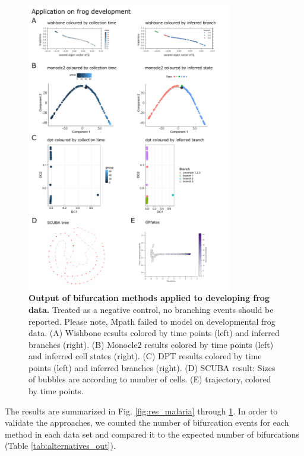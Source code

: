 \begin{figure}
    \centering
    \includegraphics[width=0.8\textwidth]{"results_frog"}
    \caption[Output of bifurcation methods applied to developing frog data]{\textbf{Output of bifurcation methods applied to developing frog data.} Treated as a negative control, no branching events should be reported. Please note, Mpath failed to model on developmental frog data. (A) Wishbone results colored by time points (left) and inferred branches (right). (B) Monocle2 results colored by time points (left) and inferred cell states (right). (C) DPT results colored by time points (left) and inferred branches (right). (D) SCUBA result: Sizes of bubbles are according to number of cells. (E)  trajectory, colored by time points.}
    \label{fig:res_frog}
\end{figure}

The results are summarized in Fig. \ref{fig:res_malaria} through \ref{fig:res_frog}. In order to validate the approaches, we counted the number of bifurcation events for each method in each data set and compared it to the expected number of bifurcations (Table \ref{tab:alternatives_out}).

